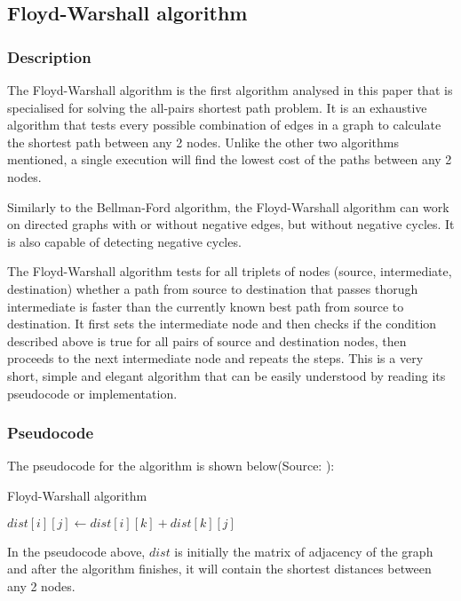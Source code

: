 \documentclass[runningheads]{llncs}
\begin{document}
\subsection{Floyd-Warshall algorithm}
\subsubsection{Description}
The Floyd-Warshall algorithm is the first algorithm analysed in this paper that is specialised for solving the all-pairs shortest path problem. It is an exhaustive algorithm that tests every possible combination of edges in a graph to calculate the shortest path between any 2 nodes. Unlike the other two algorithms mentioned, a single execution will find the lowest cost of the paths between any 2 nodes.

Similarly to the Bellman-Ford algorithm, the Floyd-Warshall algorithm can work on directed graphs with or without negative edges, but without negative cycles. It is also capable of detecting negative cycles.

The Floyd-Warshall algorithm tests for all triplets of nodes (source, intermediate, destination) whether a path from source to destination that passes thorugh intermediate is faster than the currently known best path from source to destination. It first sets the intermediate node and then checks if the condition described above is true for all pairs of source and destination nodes, then proceeds to the next intermediate node and repeats the steps. This is a very short, simple and elegant algorithm that can be easily understood by reading its pseudocode or implementation.

\subsubsection{Pseudocode}
The pseudocode for the algorithm is shown below(Source: \cite{ref_url_FW}):
\begin{algorithm}
\caption{Floyd-Warshall algorithm}\label{algBF:cap}
\begin{algorithmic}[1]
				\State $dist[i][j] \gets dist[i][k]+dist[k][j]$
			\EndIf
		\EndFor
	\EndFor
\EndFor
\end{algorithmic}
\end{algorithm}

In the pseudocode above, $dist$ is initially the matrix of adjacency of the graph and after the algorithm finishes, it will contain the shortest distances between any 2 nodes.
\end{document}
